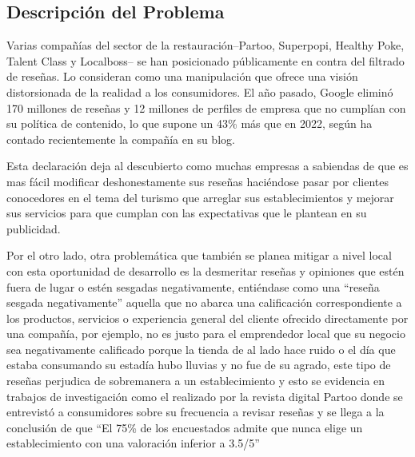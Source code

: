 \subsection{Descripción del Problema}
Varias compañías del sector de la restauración–Partoo, Superpopi, Healthy Poke, Talent Class y Localboss– se han posicionado públicamente en contra del filtrado de reseñas. Lo consideran como una manipulación que ofrece una visión distorsionada de la realidad a los consumidores. El año pasado, Google eliminó 170 millones de reseñas y 12 millones de perfiles de empresa que no cumplían con su política de contenido, lo que supone un 43\% más que en 2022, según ha contado recientemente la compañía en su blog.\cite{hotelesReseñasNeg}

Esta declaración deja al descubierto como muchas empresas a sabiendas de que es mas fácil modificar deshonestamente sus reseñas haciéndose pasar por clientes conocedores en el tema del turismo que arreglar sus establecimientos y mejorar sus servicios para que cumplan con las expectativas que le plantean en su publicidad.  

Por el otro lado, otra problemática que también se planea mitigar a nivel local con esta oportunidad de desarrollo es la desmeritar reseñas y opiniones que estén fuera de lugar o estén sesgadas negativamente, entiéndase como una “reseña sesgada negativamente” aquella que no abarca una calificación correspondiente a los productos, servicios o experiencia general del cliente ofrecido directamente por una compañía, por ejemplo, no es justo para el emprendedor local que su negocio sea negativamente calificado porque la tienda de al lado hace ruido o el día que estaba consumando su estadía hubo lluvias y no fue de su agrado, este tipo de reseñas perjudica de sobremanera a un establecimiento y esto se evidencia en trabajos de investigación como el realizado por la revista digital Partoo donde se entrevistó a consumidores sobre su frecuencia a revisar reseñas y se llega a la conclusión de que “El 75\% de los encuestados admite que nunca elige un establecimiento con una valoración inferior a 3.5/5” 